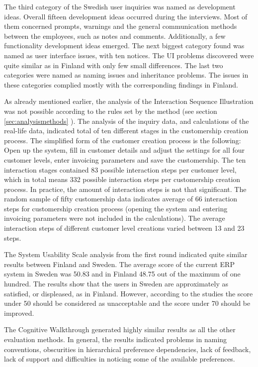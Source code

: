 \documentclass[12pt,a4paper,oneside,pdftex]{report}
\begin{document}
The third category of the Swedish user inquiries was named as development ideas. Overall fifteen development ideas occurred during the interviews. Most of them concerned prompts, warnings and the general communication methods between the employees, such as notes and comments. Additionally, a few functionality development ideas emerged. The next biggest category found was named as user interface issues, with ten notices. The UI problems discovered were quite similar as in Finland with only few small differences. The last two categories were named as naming issues and inheritance problems. The issues in these categories complied mostly with the corresponding findings in Finland. 

As already mentioned earlier, the analysis of the Interaction Sequence Illustration was not possible according to the rules set by the method (see section \ref{sec:analysismethods} ). The analysis of the inquiry data, and calculations of the real-life data, indicated total of ten different stages in the customership creation process. The simplified form of the customer creation process is the following: Open up the system, fill in customer details and adjust the settings for all four customer levels, enter invoicing parameters and save the customership. The ten interaction stages contained 83 possible interaction steps per customer level, which in total means 332 possible interaction steps per customership creation process. In practice, the amount of interaction steps is not that significant. The random sample of fifty customership data indicates average of 66 interaction steps for customership creation process (opening the system and entering invoicing parameters were not included in the calculations). The average interaction steps of different customer level creations varied between 13 and 23 steps.   

The System Usability Scale analysis from the first round indicated quite similar results between Finland and Sweden. The average score of the current ERP system in Sweden was 50.83 and in Finland 48.75 out of the maximum of one hundred. The results show that the users in Sweden are approximately as satisfied, or displeased, as in Finland. However, according to the studies \citep{RefWorks:12} the score under 50 should be considered as unacceptable and the score under 70 should be improved. 

The Cognitive Walkthrough generated highly similar results as all the other evaluation methods. In general, the results indicated problems in naming conventions, obscurities in hierarchical preference dependencies, lack of feedback, lack of support and difficulties in noticing some of the available preferences. 
\end{document}
